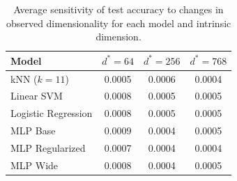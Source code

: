 \begin{table}[h]
\centering
\begin{tabular}{lccc}
\toprule
\textbf{Model} & \textbf{$d^*=64$} & \textbf{$d^*=256$} & \textbf{$d^*=768$} \\
\midrule
kNN ($k=11$) & 0.0005 & 0.0006 & 0.0004 \\
Linear SVM & 0.0008 & 0.0005 & 0.0005 \\
Logistic Regression & 0.0008 & 0.0005 & 0.0005 \\
MLP Base & 0.0009 & 0.0004 & 0.0005 \\
MLP Regularized & 0.0007 & 0.0004 & 0.0004 \\
MLP Wide & 0.0008 & 0.0004 & 0.0005 \\
\bottomrule
\end{tabular}
\caption{Average sensitivity of test accuracy to changes in observed dimensionality for each model and intrinsic dimension.}
\label{tab:sensitivity}
\end{table}
